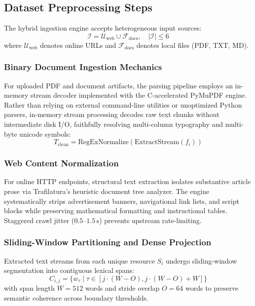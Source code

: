\documentclass[conference]{IEEEtran}
\begin{document}
\subsection{Dataset Preprocessing Steps}
The hybrid ingestion engine accepts heterogeneous input sources:
\begin{equation}
\mathcal{I} = \mathcal{U}_{\text{web}} \cup \mathcal{F}_{\text{docs}}, \quad |\mathcal{I}| \le 6
\end{equation}
where $\mathcal{U}_{\text{web}}$ denotes online URLs and $\mathcal{F}_{\text{docs}}$ denotes local files (PDF, TXT, MD).

\subsubsection{Binary Document Ingestion Mechanics}
For uploaded PDF and document artifacts, the parsing pipeline employs an in-memory stream decoder implemented with the C-accelerated PyMuPDF engine. Rather than relying on external command-line utilities or unoptimized Python parsers, in-memory stream processing decodes raw text chunks without intermediate disk I/O, faithfully resolving multi-column typography and multi-byte unicode symbols:
\begin{equation}
T_{\text{clean}} = \text{RegExNormalize}(\text{ExtractStream}(f_i))
\end{equation}

\subsubsection{Web Content Normalization}
For online HTTP endpoints, structural text extraction isolates substantive article prose via Trafilatura's heuristic document tree analyzer. The engine systematically strips advertisement banners, navigational link lists, and script blocks while preserving mathematical formatting and instructional tables. Staggered crawl jitter ($0.5$--$1.5\,\text{s}$) prevents upstream rate-limiting.

\subsubsection{Sliding-Window Partitioning and Dense Projection}
Extracted text streams from each unique resource $S_i$ undergo sliding-window segmentation into contiguous lexical spans:
\begin{equation}
C_{i,j} = \{w_{\tau} \mid \tau \in [j \cdot (W - O), j \cdot (W - O) + W]\}
\end{equation}
with span length $W = 512$ words and stride overlap $O = 64$ words to preserve semantic coherence across boundary thresholds.
\end{document}
